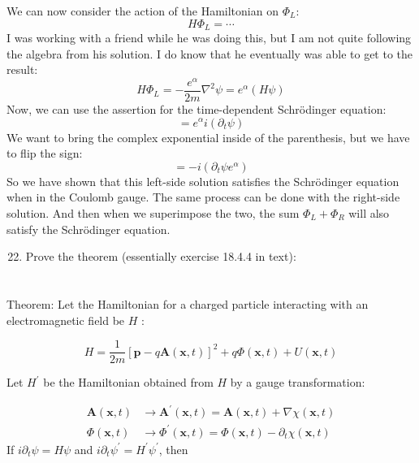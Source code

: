 \documentclass[12pt]{article}
\begin{document}
We can now consider the action of the Hamiltonian on $\Phi_L$:
\begin{equation}
    H \Phi_L = \cdots
\end{equation}
I was working with a friend while he was doing this, but I am not quite following the algebra from his solution. I do know that he eventually was able to get to the result:
\begin{equation}
  H \Phi_L = -\frac{e^{\alpha}}{2m} \nabla^2 \psi = e^{\alpha} \left( H \psi \right)
\end{equation}
Now, we can use the assertion for the time-dependent Schrödinger equation:
\begin{equation}
  = e^{\alpha} i (\partial_t \psi) 
\end{equation}
We want to bring the complex exponential inside of the parenthesis, but we have to flip the sign:
\begin{equation}
  = -i (\partial_t \psi e^{\alpha})
\end{equation}
So we have shown that this left-side solution satisfies the Schrödinger equation when in the Coulomb gauge. The same process can be done with the right-side solution. And then when we superimpose the two, the sum $\Phi_L + \Phi_R$ will also satisfy the Schrödinger equation.
\begin{enumerate}
  \setcounter{enumi}{21}
  \item Prove the theorem (essentially exercise 18.4.4 in text):
\end{enumerate}
\section{}
Theorem: Let the Hamiltonian for a charged particle interacting with an electromagnetic field be $H$ :

$$
H=\frac{1}{2 m}[\mathbf{p}-q \mathbf{A}(\mathbf{x}, t)]^{2}+q \Phi(\mathbf{x}, t)+U(\mathbf{x}, t)
$$

Let $H^{\prime}$ be the Hamiltonian obtained from $H$ by a gauge transformation:

$$
\begin{aligned}
\mathbf{A}(\mathbf{x}, t) & \rightarrow \mathbf{A}^{\prime}(\mathbf{x}, t)=\mathbf{A}(\mathbf{x}, t)+\nabla \chi(\mathbf{x}, t) \\
\Phi(\mathbf{x}, t) & \rightarrow \Phi^{\prime}(\mathbf{x}, t)=\Phi(\mathbf{x}, t)-\partial_{t} \chi(\mathbf{x}, t)
\end{aligned}
$$
If $i \partial_{t} \psi=H \psi$ and $i \partial_{t} \psi^{\prime}=H^{\prime} \psi^{\prime}$, then
\end{document}
